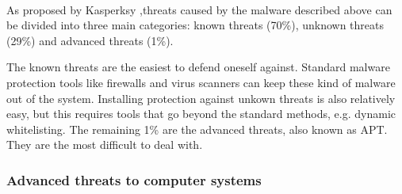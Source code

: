 ~~\\
As proposed by Kasperksy \cite{APTKaspersky} ,threats caused by the malware described above can be divided into three main categories: known threats (70\%), unknown threats (29\%) and advanced threats (1\%). 

The known threats are the easiest to defend oneself against. Standard malware protection tools like firewalls and virus scanners can keep these kind of malware out of the system. Installing protection against unkown threats is also relatively easy, but this requires tools that go beyond the standard methods, e.g. dynamic whitelisting. The remaining 1\% are the advanced threats, also known as APT. They are the most difficult to deal with.

\subsubsection{Advanced threats to computer systems}

